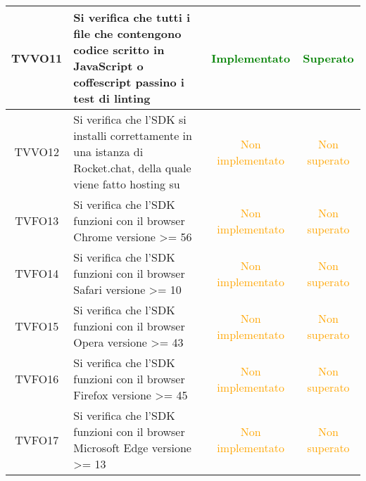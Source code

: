 \begin{center}
\begin{longtable}{|c|>{\centering}m{10cm}|c|c|}
		TVVO11 & Si verifica che tutti i file che contengono codice scritto in JavaScript o coffescript passino i test di linting & \textcolor{Green}{Implementato} & \textcolor{Green}{Superato} \\ \hline
		TVVO12 & Si verifica che l'SDK si installi correttamente in una istanza di Rocket.chat, della quale viene fatto hosting su \termine{Heroku} & \textcolor{Orange}{Non implementato} & \textcolor{Orange}{Non superato} \\ \hline
		TVFO13 & Si verifica che l'SDK funzioni con il browser Chrome versione >= 56 & \textcolor{Orange}{Non implementato} & \textcolor{Orange}{Non superato} \\ \hline
		TVFO14 & Si verifica che l'SDK funzioni con il browser Safari versione >= 10 & \textcolor{Orange}{Non implementato} & \textcolor{Orange}{Non superato} \\ \hline
		TVFO15 & Si verifica che l'SDK funzioni con il browser Opera versione >= 43 & \textcolor{Orange}{Non implementato} & \textcolor{Orange}{Non superato} \\ \hline
		TVFO16 & Si verifica che l'SDK funzioni con il browser Firefox versione >= 45 & \textcolor{Orange}{Non implementato} & \textcolor{Orange}{Non superato} \\ \hline
		TVFO17 & Si verifica che l'SDK funzioni con il browser Microsoft Edge versione >= 13 & \textcolor{Orange}{Non implementato} & \textcolor{Orange}{Non superato} \\ \hline
	\end{longtable}
\end{center}
